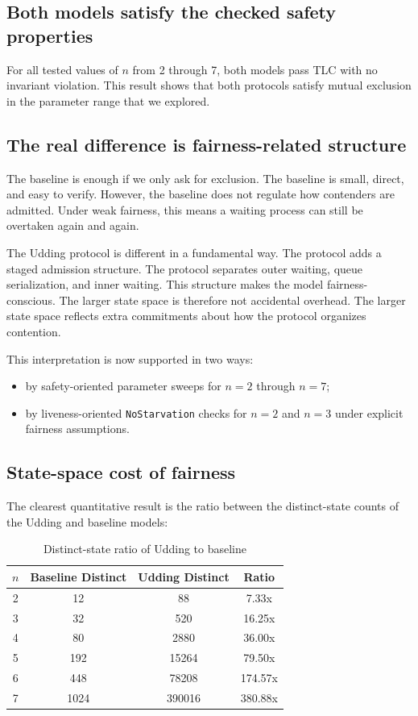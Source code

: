 \documentclass[11pt]{article}
\begin{document}
\subsection{Both models satisfy the checked safety properties}

For all tested values of $n$ from 2 through 7, both models pass TLC with no invariant violation. This result shows that both protocols satisfy mutual exclusion in the parameter range that we explored.

\subsection{The real difference is fairness-related structure}

The baseline is enough if we only ask for exclusion. The baseline is small, direct, and easy to verify. However, the baseline does not regulate how contenders are admitted. Under weak fairness, this means a waiting process can still be overtaken again and again.

The Udding protocol is different in a fundamental way. The protocol adds a staged admission structure. The protocol separates outer waiting, queue serialization, and inner waiting. This structure makes the model fairness-conscious. The larger state space is therefore not accidental overhead. The larger state space reflects extra commitments about how the protocol organizes contention.

This interpretation is now supported in two ways:

\begin{itemize}
  \item by safety-oriented parameter sweeps for $n=2$ through $n=7$;
  \item by liveness-oriented \texttt{NoStarvation} checks for $n=2$ and $n=3$ under explicit fairness assumptions.
\end{itemize}

\subsection{State-space cost of fairness}

The clearest quantitative result is the ratio between the distinct-state counts of the Udding and baseline models:

\begin{table}[H]
\centering
\caption{Distinct-state ratio of Udding to baseline}
\begin{tabular}{cccc}
\toprule
$n$ & Baseline Distinct & Udding Distinct & Ratio \\
\midrule
2 & 12 & 88 & 7.33x \\
3 & 32 & 520 & 16.25x \\
4 & 80 & 2880 & 36.00x \\
5 & 192 & 15264 & 79.50x \\
6 & 448 & 78208 & 174.57x \\
7 & 1024 & 390016 & 380.88x \\
\bottomrule
\end{tabular}
\end{table}
\end{document}
